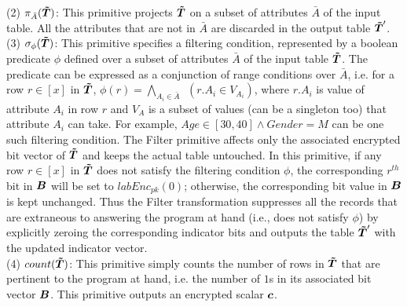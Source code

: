     (2) $\pi_{\bar{A}}(\boldsymbol{\tilde{T}})$: This primitive projects $\boldsymbol{\tilde{T}}$ on  a subset of attributes $\bar{A}$ of the input table. All the attributes that are not in $\bar{A}$ are discarded in the output table $\boldsymbol{\tilde{T}}'$.\\
	(3) $\sigma_{\phi}(\boldsymbol{\tilde{T}})$: This primitive specifies a filtering condition, represented by a boolean predicate $\phi$ defined over a subset of attributes $\bar{A}$ of the input table $\boldsymbol{\tilde{T}}$. The predicate can be expressed as a conjunction of range conditions over $\bar{A}$, i.e. for a row $r \in [x]$ in $\boldsymbol{\tilde{T}}$, $\phi(r) = \bigwedge_{A_i \in \bar{A}} ~~(r.{A_i} \in V_{A_i})$,  where $r.A_i$ is value of attribute $A_i$ in row $r$ and $V_A$ is a subset of values (can be a singleton too) that attribute $A_i$ can take.  For example, $Age\in [30,40]\wedge Gender=M$ can be one such  filtering condition. The \textsf{Filter} primitive affects only the associated encrypted bit vector of $\boldsymbol{\tilde{T}}$ and keeps the actual table untouched.  In this primitive, if any row $r \in [x]$ in $\boldsymbol{\tilde{T}}$ does not satisfy the filtering condition $\phi$, the corresponding $r^{th}$ bit in $\boldsymbol{B}$ will be set to $labEnc_{pk}(0)$; otherwise, the corresponding bit value in $\boldsymbol{B}$ is kept unchanged. 
Thus the \textsf{Filter} transformation suppresses all the records that are extraneous to answering the program at hand (i.e., does not satisfy $\phi$) by explicitly zeroing the corresponding indicator bits and outputs the table $\boldsymbol{\tilde{T}}'$ with the updated indicator vector.\\
(4) $count(\boldsymbol{\tilde{T}})$: This primitive simply counts the number of rows in $\boldsymbol{\tilde{T}}$ that are pertinent to the program at hand, i.e. the number of $1$s in its associated bit vector $\boldsymbol{B}$.  This primitive outputs an encrypted scalar $\boldsymbol{c}$. \\%
